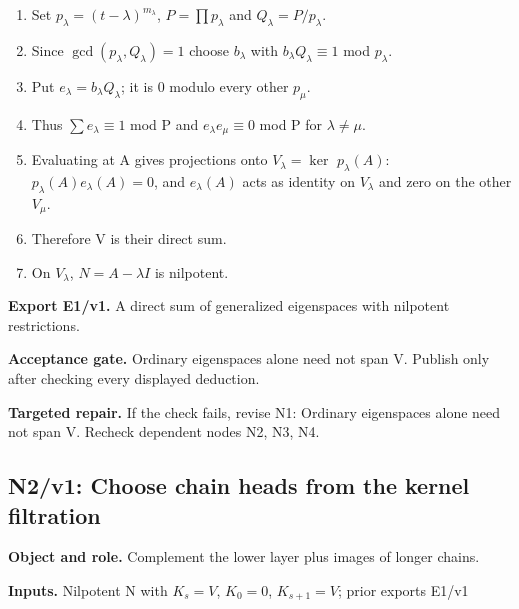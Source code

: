 \documentclass[preprint,12pt,aps,pra,showkeys,amsmath,amssymb,superscriptaddress,floatfix]{revtex4-2}
\theoremstyle{definition}
\theoremstyle{remark}
\newcommand{\field}[2]{\par\smallskip\noindent\textbf{#1.} #2\par}
\begin{document}
\begin{enumerate}[label=N1.\arabic*,leftmargin=3.4em]

\item Set \(p_\lambda =(t-\lambda )^{m_\lambda }\), \(P=\prod p_\lambda\) and
\(Q_\lambda =P/p_\lambda\).

\item Since \(\operatorname{gcd} (p_\lambda ,Q_\lambda )=1\) choose
\(b_\lambda\) with \(b_\lambda Q_\lambda \equiv 1\) mod \(p_\lambda\).

\item Put \(e_\lambda =b_\lambda Q_\lambda\); it is 0 modulo every other
\(p_\mu\).

\item Thus \(\sum e_\lambda \equiv 1\) mod P and \(e_\lambda e_\mu \equiv 0\)
mod P for \(\lambda \ne \mu\).

\item Evaluating at A gives projections onto \(V_\lambda =\operatorname{ker}\)
\(p_\lambda (A)\): \(p_\lambda (A)e_\lambda (A)=0\), and
\(e_\lambda (A)\) acts as identity on \(V_\lambda\) and zero on the
other \(V_\mu\).

\item Therefore V is their direct sum.

\item On \(V_\lambda\), \(N=A-\lambda I\) is nilpotent.

\end{enumerate}

\field{Export E1/v1}{A direct sum of generalized eigenspaces with nilpotent restrictions.}

\field{Acceptance gate}{Ordinary eigenspaces alone need not span V. Publish only after checking
every displayed deduction.}

\field{Targeted repair}{If the check fails, revise N1: Ordinary eigenspaces alone need not span
V. Recheck dependent nodes N2, N3, N4.}

\clearpage

\subsection{N2/v1: Choose chain heads from the kernel filtration}

\field{Object and role}{Complement the lower layer plus images of longer chains.}

\field{Inputs}{Nilpotent N with \(K_s=V\), \(K_{0}=0\), \(K_{s+1}=V\); prior exports
E1/v1}
\end{document}
